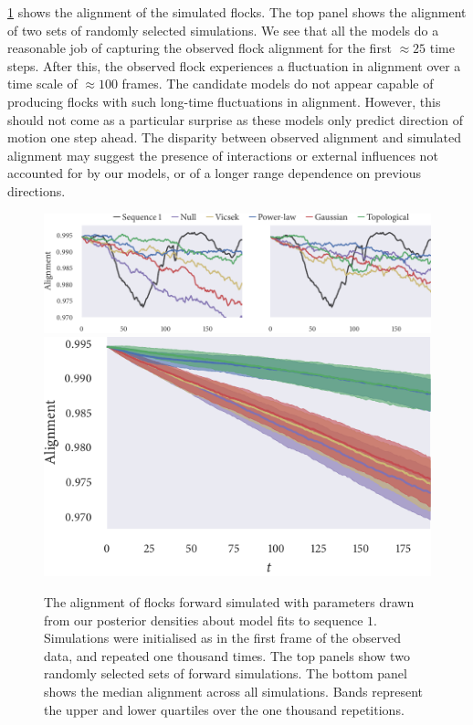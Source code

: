 \cref{fig:checks_seq1} shows the alignment of the simulated flocks. The top
panel shows the alignment of two sets of randomly selected simulations. We see
that all the models do a reasonable job of capturing the observed flock
alignment for the first $\approx25$ time steps. After this, the observed flock
experiences a fluctuation in alignment over a time scale of $\approx100$
frames. The candidate models do not appear capable of producing flocks with
such long-time fluctuations in alignment. However, this should not come as a
particular surprise as these models only predict direction of motion one step
ahead. The disparity between observed alignment and simulated alignment may
suggest the presence of interactions or external influences not accounted for
by our models, or of a longer range dependence on previous directions.

\begin{figure}[tbp]
  \includegraphics{alignment/alignment_single_1.pdf}\vspace{1em}\\
  \includegraphics{alignment/alignment_ensemble_1.pdf}
  \caption{The alignment of flocks forward simulated with parameters drawn from
    our posterior densities about model fits to sequence $1$. Simulations were
    initialised as in the first frame of the observed data, and repeated one
    thousand times. The top panels show two randomly selected sets of forward
    simulations. The bottom panel shows the median alignment across all
    simulations. Bands represent the upper and lower quartiles over the one
    thousand repetitions.}
  \label{fig:checks_seq1}
\end{figure}

